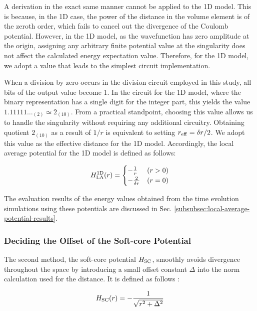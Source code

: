 \documentclass[jctc-draft.tex]{subfiles}
\begin{document}
A derivation in the exact same manner cannot be applied to the 1D model. This is
because, in the 1D case, the power of the distance in the volume element is of
the zeroth order, which fails to cancel out the divergence of the Coulomb
potential. However, in the 1D model, as the wavefunction has zero amplitude at
the origin, assigning any arbitrary finite potential value at the singularity
does not affect the calculated energy expectation value. Therefore, for the 1D
model, we adopt a value that leads to the simplest circuit implementation.

When a division by zero occurs in the division circuit employed in this study,
all bits of the output value become 1. In the circuit for the 1D model, where
the binary representation has a single digit for the integer part, this yields
the value $1.11111\dots_{(2)} \simeq 2_{(10)}$. From a practical standpoint,
choosing this value allows us to handle the singularity without requiring any
additional circuitry. Obtaining quotient $2_{(10)}$ as a result of $1/r$ is
equivalent to setting $r_{\mathrm{eff}} = \delta r/2$. We adopt this value as the effective
distance for the 1D model. Accordingly, the local average potential for the 1D
model is defined as follows:

\begin{equation}
H_{\mathrm{LA}}^{\mathrm{1D}}(r) = \begin{cases}
-\frac{1}{r} & (r>0) \\
-\frac{2}{\delta r} & (r=0)
\end{cases}
\label{eq:Hlar1d-fixed}
\end{equation}

The evaluation results of the energy values obtained from the time evolution
simulations using these potentials are discussed in Sec.
\ref{subsubsec:local-average-potential-results}.

\subsubsection{Deciding the Offset of the Soft-core Potential}
\label{subsubsec:deciding-offset-of-soft-core-potential}

The second method, the soft-core potential $H_{\mathrm{SC}}$, smoothly avoids divergence
throughout the space by introducing a small offset constant $\Delta$ into the
norm calculation used for the distance. It is defined as follows
\cite{Kivlichan_2017}:

\begin{equation}
H_{\mathrm{SC}}(r) = -\frac{1}{\sqrt{r^2+\Delta^2}}
\label{eq:Hsc2r}
\end{equation}
\end{document}
